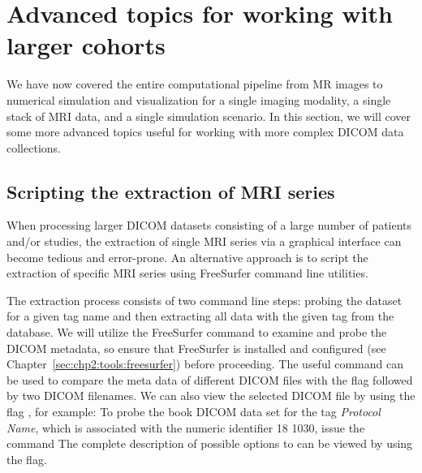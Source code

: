 \section{Advanced topics for working with larger cohorts}
\label{sec:chp3:advanced}
We have now covered the entire computational pipeline from MR images
to numerical simulation and visualization for a single imaging
modality, a single stack of MRI data, and a single simulation scenario. In
this section, we will cover some more advanced topics useful for
working with more complex DICOM data collections.

\subsection{Scripting the extraction of MRI series}

When processing larger DICOM datasets consisting of a large number of
patients and/or studies, the extraction of single MRI series via a
graphical interface can become tedious and error-prone. An alternative
approach is to script the extraction of specific MRI series using
FreeSurfer command line utilities.

%
%
The extraction process consists of two command line steps: probing the
dataset for a given tag name and then extracting all data with the
given tag from the database. We will utilize the FreeSurfer command
 to examine and probe the DICOM metadata, so
ensure that FreeSurfer is installed and configured (see
Chapter~\ref{sec:chp2:tools:freesurfer}) before proceeding. The useful
command  can be used to compare the meta
data of different DICOM files with the flag  followed
by two DICOM filenames. We can also view the selected DICOM file by
using the flag , for example:
\noindent To probe the book DICOM data set for the tag \textit{Protocol Name}, which
is associated with the numeric identifier 18 1030, issue the command
\noindent The complete description of possible options to
 can be viewed by using the  flag.

